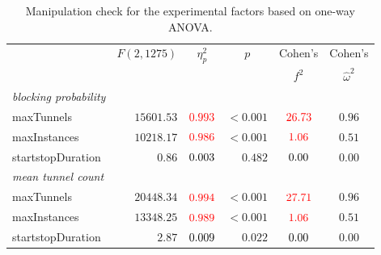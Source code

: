 \begin{table}\caption{Manipulation check for the experimental factors based on one-way ANOVA.}
\centering
\label{tab:manipulation2color}
\tabcolsep=0.11cm
\begin{tabu}{lrrrcc}
\toprule
&  &  &  & Cohen's & Cohen's\\ 
&  & & & $f^2$ & $\hat{\omega}^2$ \\ 
\midrule
\emph{blocking probability}  & & & & &\\ 
maxTunnels &  $15601.53$ & $\textcolor{red}{0.993}$ & $<0.001$ & $\textcolor{red}{26.73}$ & $0.96$\\ 
maxInstances &  $10218.17$ & $\textcolor{red}{0.986}$ & $<0.001$ & $\textcolor{red}{1.06}$ & $0.51$\\ 
startstopDuration &  $0.86$ & $\textcolor{black}{0.003}$ & $0.482$ & $\textcolor{black}{0.00}$ & $0.00$\\ 
\midrule
\emph{mean tunnel count}  & & & & &\\ 
maxTunnels &  $20448.34$ & $\textcolor{red}{0.994}$ & $<0.001$ & $\textcolor{red}{27.71}$ & $0.96$\\ 
maxInstances &  $13348.25$ & $\textcolor{red}{0.989}$ & $<0.001$ & $\textcolor{red}{1.06}$ & $0.51$\\ 
startstopDuration &  $2.87$ & $\textcolor{black}{0.009}$ & $0.022$ & $\textcolor{black}{0.00}$ & $0.00$\\ 
\bottomrule
\end{tabu}
\end{table}

